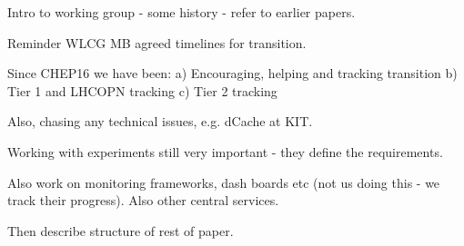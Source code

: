 
Intro to working group - some history - refer to earlier papers.

Reminder WLCG MB agreed timelines for transition.

Since CHEP16 we have been:
a) Encouraging, helping and tracking transition
b) Tier 1 and LHCOPN tracking
c) Tier 2 tracking

Also, chasing any technical issues, e.g. dCache at KIT.

Working with experiments still very important - they define the requirements.

Also work on monitoring frameworks, dash boards etc (not us doing this - we track their progress).
Also other central services.

Then describe structure of rest of paper.
